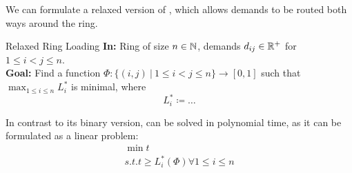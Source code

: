 

We can formulate a relaxed version of \RL, which allows demands to be routed both ways around the ring.
\begin{problem}{Relaxed Ring Loading}
	\textbf{In:} Ring of size $n \in \mathbb{N}$, demands $d_{ij} \in \mathbb{R}^+$ for $1 \leq i < j \leq n$.\\
	\textbf{Goal:} Find a function $\Phi: \{(i, j)~|~1 \leq i < j \leq n\} \rightarrow [0, 1]$ such that $\max_{1 \leq i \leq n} L_i^\ast$ is minimal, where
	\begin{equation}
		L_i^\ast \coloneqq \ldots
	\end{equation}
\end{problem}
In contrast to its binary version, \RRL can be solved in polynomial time, as it can be formulated as a linear problem:
\begin{align}
	\min t\\
	s.t. t \geq L_i^\ast(\Phi) \forall 1 \leq i \leq n
\end{align}